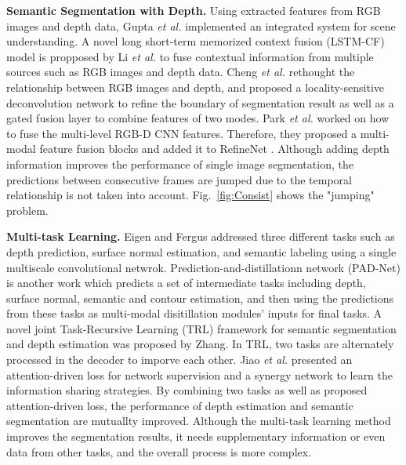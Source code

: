 {\bf Semantic Segmentation with Depth.}
%
Using extracted features from RGB images and depth data, Gupta \emph{et al.} \cite{Gupta2014} implemented an integrated system for scene understanding.
%
 A novel long short-term memorized context fusion (LSTM-CF) model is propposed by Li \emph{et al.} \cite{Li2016} to fuse contextual information from multiple sources such as RGB images and depth data.
% 
Cheng \emph{et al.} \cite{Cheng2017} rethought the relationship between RGB images and depth, and proposed a locality-sensitive deconvolution network to refine the boundary of segmentation result as well as a gated fusion layer to combine features of two modes.
%
Park \emph{et al.} \cite{Park2017} worked on how to fuse the multi-level RGB-D CNN features.
%
Therefore, they proposed a multi-modal feature fusion blocks and added it to RefineNet \cite{Lin2017}.
%
Although adding depth information improves the performance of single image segmentation, the predictions between consecutive frames are jumped due to the temporal relationship is not taken into account.
%
Fig.~\ref{fig:Consist} shows the "jumping" problem.

{\bf Multi-task Learning.} 
%
Eigen and Fergus \cite{Eigen2015} addressed three different tasks such as depth prediction, surface normal estimation, and semantic labeling using a single multiscale convolutional netwrok. 
%
Prediction-and-distillationn network (PAD-Net) is another work\cite{Xu2018} which predicts a set of intermediate tasks including depth, surface normal, semantic and contour estimation, and then using the predictions from these tasks as multi-modal disitillation modules' inputs for final tasks.  
%
A novel joint Task-Recursive Learning (TRL) \cite{Zhang2018} framework for semantic segmentation and depth estimation was proposed by Zhang. 
%
In TRL, two tasks are alternately processed in the decoder to imporve each other.
% 
Jiao \emph{et al.} \cite{Jiao2018} presented an attention-driven loss for network supervision and a synergy network to learn the information sharing strategies. 
%
By combining two tasks as well as proposed attention-driven loss, the performance of depth estimation and semantic segmentation are mutuallty improved.
%
Although the multi-task learning method improves the segmentation results, it needs supplementary information or even data from other tasks, and the overall process is more complex.

